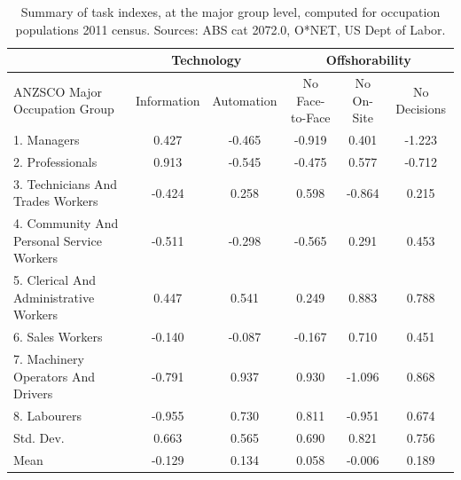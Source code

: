 \begin{table}
\centering
\begin{tabular}{|l|cc|ccc|}
  \hline
 & \multicolumn{2}{|c|}{Technology} & \multicolumn{3}{|c|}{Offshorability} \\
  \hline
 ANZSCO Major Occupation Group & Information & Automation & No Face-to-Face & No On-Site & No Decisions \\ 
  \hline
  1. Managers & 0.427 & -0.465 & -0.919 & 0.401 & -1.223 \\ 
  2. Professionals & 0.913 & -0.545 & -0.475 & 0.577 & -0.712 \\ 
  3. Technicians And Trades Workers & -0.424 & 0.258 & 0.598 & -0.864 & 0.215 \\ 
  4. Community And Personal Service Workers & -0.511 & -0.298 & -0.565 & 0.291 & 0.453 \\ 
  5. Clerical And Administrative Workers & 0.447 & 0.541 & 0.249 & 0.883 & 0.788 \\ 
  6. Sales Workers & -0.140 & -0.087 & -0.167 & 0.710 & 0.451 \\ 
  7. Machinery Operators And Drivers & -0.791 & 0.937 & 0.930 & -1.096 & 0.868 \\ 
  8. Labourers & -0.955 & 0.730 & 0.811 & -0.951 & 0.674 \\ 
\hline
  Std. Dev. & 0.663 & 0.565 & 0.690 & 0.821 & 0.756 \\ 
  Mean & -0.129 & 0.134 & 0.058 & -0.006 & 0.189 \\ 
   \hline
\end{tabular}
\caption{Summary of task indexes, at the major group level, computed for occupation populations 2011 census. Sources: ABS cat 2072.0, O*NET, US Dept of Labor.}
\label{tbl:indexes}
\end{table}